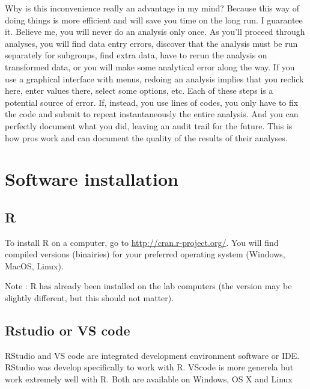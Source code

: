 \documentclass[
  12pt,
]{book}
\begin{document}
Why is this inconvenience really an advantage in my mind? Because this way of doing things is more efficient and will save you time on the long run. I guarantee it. Believe me, you will never do an analysis only once. As you'll proceed through analyses, you will find data entry errors, discover that the analysis must be run separately for subgroups, find extra data, have to rerun the analysis on transformed data, or you will make some analytical error along the way. If you use a graphical interface with menus, redoing an analysis implies that you reclick here, enter values there, select some options, etc. Each of these steps is a potential source of error. If, instead, you use lines of codes, you only have to fix the code and submit to repeat instantaneously the entire analysis. And you can perfectly document what you did, leaving an audit trail for the future. This is how pros work and can document the quality of the results of their analyses.

\hypertarget{software-installation}{%
\section*{Software installation}\label{software-installation}}

\hypertarget{r}{%
\subsection*{R}\label{r}}

To install R on a computer, go to \url{http://cran.r-project.org/}. You will find compiled versions (binairies) for your preferred operating system (Windows, MacOS, Linux).

Note : R has already been installed on the lab computers (the version may be slightly different, but this should not matter).

\hypertarget{rstudio-or-vs-code}{%
\subsection*{Rstudio or VS code}\label{rstudio-or-vs-code}}

RStudio and VS code are integrated development environment software or IDE. RStudio was develop specifically to work with R. VScode is more generela but work extremely well with R. Both are available on Windows, OS X and Linux
\end{document}

